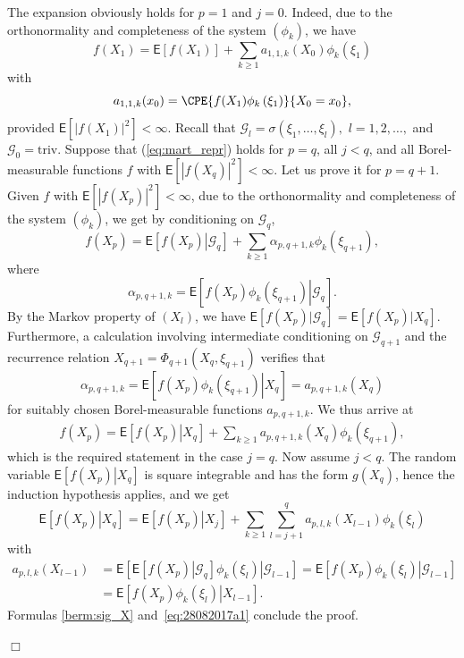 \documentclass[preprint]{imsart}
\newcommand{\proofendsign}{$\Box$}
\newenvironment{proof}{{\noindent \bf Proof }}
 {{\hspace*{\fill}\proofendsign\par\bigskip}}
\begin{document}
\begin{proof}
The expansion obviously holds for $p=1$ and $j=0$.
Indeed, due to the orthonormality and completeness
of the system $\left(\phi_{k}\right)$, we have
\[
f(X_{1})=\mathsf{E}\left[f(X_{1})\right]+\sum_{k\geq1}a_{1,1,k}(X_0)\phi_{k}(\xi_{1})
\]
with
\[
a_{1,1,k}(x_0)=\CPE{f(X_{1})\phi_{k}\left(\xi_{1}\right)}{X_0=x_0},
\]
provided $\mathsf{E}\left[\left|f(X_{1})\right|^{2}\right]<\infty.$
Recall that $\mathcal{G}_l=\sigma(\xi_{1},\ldots,\xi_{l}),$
$l=1,2,\ldots, $
and $\mathcal{G}_0=\mathrm{triv}$.
Suppose that (\ref{eq:mart_repr})
holds for $p=q$, all $j<q$, and all Borel-measurable functions
$f$ with $\mathsf{E}\left[|f(X_{q})|^2\right]<\infty$.
Let us prove it for $p=q+1$.
Given $f$ with $\mathsf{E}\left[|f(X_{p})|^2\right]<\infty$,
due to the orthonormality and completeness
of the system $\left(\phi_{k}\right)$, we get by
conditioning on $\mathcal{G}_{q}$,
\[
f(X_{p})=\mathsf{E}\left[\left.f(X_{p})\right|{\mathcal{G}}_q\right]+\sum_{k\geq1}\alpha_{p,q+1,k}\phi_{k}(\xi_{q+1}),
\]
where
\begin{equation*}
\alpha_{p,q+1,k}
=\mathsf{E}\left[\left.f(X_{p})\phi_{k}(\xi_{q+1})\right|\mathcal G_q\right].
\end{equation*}
By the Markov property of $(X_{l})$,
we have
$\mathsf{E}[f(X_{p})|\mathcal{G}_q]
=\mathsf{E}[f(X_{p})|X_{q}]$.
Furthermore, a calculation involving
intermediate conditioning on $\mathcal G_{q+1}$
and the recurrence relation
$X_{q+1}=\Phi_{q+1}(X_{q},\xi_{q+1})$
verifies that
\[
\alpha_{p,q+1,k}=\mathsf{E}\left[\left.f(X_{p})\phi_{k}(\xi_{q+1})\right|X_{q}\right]
=a_{p,q+1,k}(X_{q})
\]
for suitably chosen
Borel-measurable functions $a_{p,q+1,k}$.
We thus arrive at
\begin{align}
\label{berm:sig_X}
f(X_{p})=\mathsf{E}\left[\left.f(X_{p})\right|X_{q}\right]+\sum_{k\geq1}a_{p,q+1,k}(X_{q})\phi_{k}(\xi_{q+1}),
\end{align}
which is the required statement in the case $j=q$.
Now assume $j<q$.
The random variable
$\mathsf{E}\left[\left.f(X_{p})\right|X_{q}\right]$
is square integrable and has the form
$g(X_{q})$,
hence the induction hypothesis applies, and we get
\begin{equation}\label{eq:28082017a1}
\mathsf{E}\left[\left.f(X_{p})\right|X_{q}\right]=\mathsf{E}\left[\left.f(X_{p})\right|X_{j}\right]+\sum_{k\geq1}\sum_{l=j+1}^{q}a_{p,l,k}(X_{l-1})\phi_{k}(\xi_{l})
\end{equation}
with
\begin{align*}
a_{p,l,k}(X_{l-1}) &= \mathsf{E}\left[\left.\mathsf{E}\left[\left.f(X_{p})\right|\mathcal{G}_{q}\right]\phi_{k}(\xi_{l})\right|\mathcal{G}_{l-1}\right]
= \mathsf{E}\left[\left.f(X_{p})\phi_{k}(\xi_{l})\right|\mathcal{G}_{l-1}\right]\\
&=\mathsf{E}\left[\left.f(X_{p})\phi_{k}(\xi_{l})\right|X_{l-1}\right].
\end{align*}
Formulas \eqref{berm:sig_X}
and~\eqref{eq:28082017a1} conclude the proof.
\end{proof}
\end{document}
